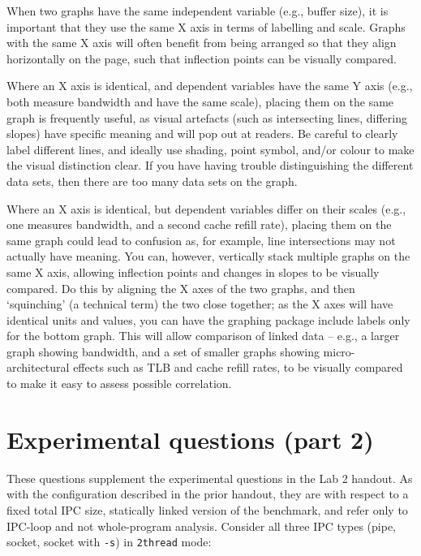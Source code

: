 \documentclass[a4paper,10pt]{article}
\begin{document}
When two graphs have the same independent variable (e.g., buffer size), it is
important that they use the same X axis in terms of labelling and scale.
Graphs with the same X axis will often benefit from being arranged so that
they align horizontally on the page, such that inflection points can be
visually compared.

Where an X axis is identical, and dependent variables have the same Y axis
(e.g., both measure bandwidth and have the same scale), placing them on the
same graph is frequently useful, as visual artefacts (such as intersecting
lines, differing slopes) have specific meaning and will pop out at readers.
Be careful to clearly label different lines, and ideally use shading, point
symbol, and/or colour to make the visual distinction clear.
If you have having trouble distinguishing the different data sets, then there
are too many data sets on the graph.

Where an X axis is identical, but dependent variables differ on their scales
(e.g., one measures bandwidth, and a second cache refill rate), placing them on
the same graph could lead to confusion as, for example, line intersections may
not actually have meaning.
You can, however, vertically stack multiple graphs on the same X axis,
allowing inflection points and changes in slopes to be visually compared.
Do this by aligning the X axes of the two graphs, and then `squinching' (a
technical term) the two close together; as the X axes will have identical
units and values, you can have the graphing package include labels only for
the bottom graph.
This will allow comparison of linked data -- e.g., a larger graph showing
bandwidth, and a set of smaller graphs showing micro-architectural effects
such as TLB and cache refill rates, to be visually compared to make it easy to
assess possible correlation.

\section*{Experimental questions (part 2)}

These questions supplement the experimental questions in the Lab 2 handout.
As with the configuration described in the prior handout, they are with
respect to a fixed total IPC size, statically linked version of the benchmark,
and refer only to IPC-loop and not whole-program analysis.
Consider all three IPC types (pipe, socket, socket with \texttt{-s}) in
\texttt{2thread} mode:
\end{document}
